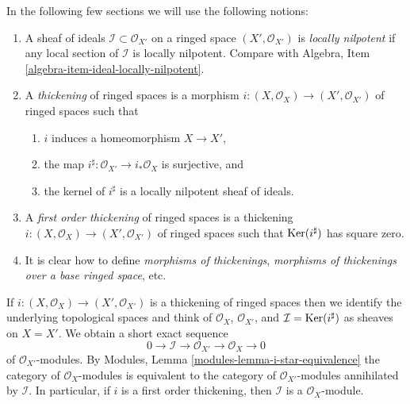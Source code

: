 \noindent
In the following few sections we will use the following notions:
\begin{enumerate}
\item A sheaf of ideals $\mathcal{I} \subset \mathcal{O}_{X'}$ on
a ringed space $(X', \mathcal{O}_{X'})$ is {\it locally nilpotent}
if any local section of $\mathcal{I}$ is locally nilpotent.
Compare with Algebra, Item \ref{algebra-item-ideal-locally-nilpotent}.
\item A {\it thickening} of ringed spaces is a morphism
$i : (X, \mathcal{O}_X) \to (X', \mathcal{O}_{X'})$ of ringed spaces
such that
\begin{enumerate}
\item $i$ induces a homeomorphism $X \to X'$,
\item the map $i^\sharp : \mathcal{O}_{X'} \to i_*\mathcal{O}_X$
is surjective, and
\item the kernel of $i^\sharp$ is a locally nilpotent sheaf of ideals.
\end{enumerate}
\item A {\it first order thickening} of ringed spaces is a thickening
$i : (X, \mathcal{O}_X) \to (X', \mathcal{O}_{X'})$ of ringed spaces
such that $\mathop{\mathrm{Ker}}(i^\sharp)$ has square zero.
\item It is clear how to define {\it morphisms of thickenings},
{\it morphisms of thickenings over a base ringed space}, etc.
\end{enumerate}
If $i : (X, \mathcal{O}_X) \to (X', \mathcal{O}_{X'})$ is a thickening
of ringed spaces then we identify the underlying topological spaces
and think of $\mathcal{O}_X$, $\mathcal{O}_{X'}$, and
$\mathcal{I} = \mathop{\mathrm{Ker}}(i^\sharp)$ as sheaves on $X = X'$. We obtain
a short exact sequence
$$
0 \to \mathcal{I} \to \mathcal{O}_{X'} \to \mathcal{O}_X \to 0
$$
of $\mathcal{O}_{X'}$-modules. By
Modules, Lemma \ref{modules-lemma-i-star-equivalence}
the category of $\mathcal{O}_X$-modules is equivalent to the category
of $\mathcal{O}_{X'}$-modules annihilated by $\mathcal{I}$. In particular,
if $i$ is a first order thickening, then
$\mathcal{I}$ is a $\mathcal{O}_X$-module.

